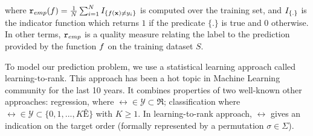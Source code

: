 \noindent
where ${\tt r}_{emp}(f) = \frac{1}{N} \sum_{i=1}^N I_{\left \{ f({\bf x}) \neq y_i \right \}}$ is computed over the training set, and $I_{\left \{ . \right \}}$ is the indicator function which returns $1$ if the predicate $\{.\}$ is true and $0$ otherwise. In other terms, ${\tt r}_{emp}$ is a quality measure relating the label to the prediction provided by the function $f$ on the training dataset $S$.

To model our prediction problem, we use a statistical learning approach called learning-to-rank. This approach has been a hot topic in Machine Learning community for the last 10 years. It combines properties of two well-known other approaches: regression, where $\rel \in \mathcal{Y}  \subset \Re$; classification where $\rel \in \mathcal{Y}  \subset \{0,1, ..., KÊ\}$ with $K \geq 1$. In learning-to-rank approach, $\rel$ gives an indication on the target order (formally represented by a permutation $\sigma \in \Sigma$). 

%
%
%
%



